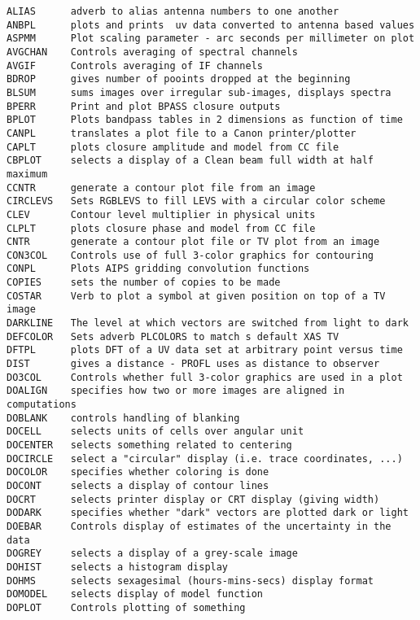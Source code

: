 
\vskip 0.5pt
\bbve\begin{verbatim}
ALIAS      adverb to alias antenna numbers to one another
ANBPL      plots and prints  uv data converted to antenna based values
ASPMM      Plot scaling parameter - arc seconds per millimeter on plot
AVGCHAN    Controls averaging of spectral channels
AVGIF      Controls averaging of IF channels
BDROP      gives number of pooints dropped at the beginning
BLSUM      sums images over irregular sub-images, displays spectra
BPERR      Print and plot BPASS closure outputs
BPLOT      Plots bandpass tables in 2 dimensions as function of time
CANPL      translates a plot file to a Canon printer/plotter
CAPLT      plots closure amplitude and model from CC file
CBPLOT     selects a display of a Clean beam full width at half maximum
CCNTR      generate a contour plot file from an image
CIRCLEVS   Sets RGBLEVS to fill LEVS with a circular color scheme
CLEV       Contour level multiplier in physical units
CLPLT      plots closure phase and model from CC file
CNTR       generate a contour plot file or TV plot from an image
CON3COL    Controls use of full 3-color graphics for contouring
CONPL      Plots AIPS gridding convolution functions
COPIES     sets the number of copies to be made
COSTAR     Verb to plot a symbol at given position on top of a TV image
DARKLINE   The level at which vectors are switched from light to dark
DEFCOLOR   Sets adverb PLCOLORS to match s default XAS TV
DFTPL      plots DFT of a UV data set at arbitrary point versus time
DIST       gives a distance - PROFL uses as distance to observer
DO3COL     Controls whether full 3-color graphics are used in a plot
DOALIGN    specifies how two or more images are aligned in computations
DOBLANK    controls handling of blanking
DOCELL     selects units of cells over angular unit
DOCENTER   selects something related to centering
DOCIRCLE   select a "circular" display (i.e. trace coordinates, ...)
DOCOLOR    specifies whether coloring is done
DOCONT     selects a display of contour lines
DOCRT      selects printer display or CRT display (giving width)
DODARK     specifies whether "dark" vectors are plotted dark or light
DOEBAR     Controls display of estimates of the uncertainty in the data
DOGREY     selects a display of a grey-scale image
DOHIST     selects a histogram display
DOHMS      selects sexagesimal (hours-mins-secs) display format
DOMODEL    selects display of model function
DOPLOT     Controls plotting of something

\end{verbatim}

